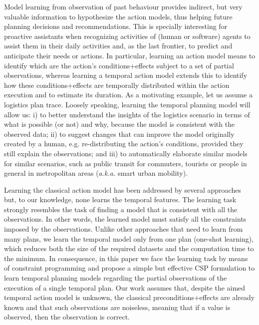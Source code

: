 \documentclass[runningheads]{llncs}
\begin{document}
Model learning from observation of past behaviour provides indirect, but very valuable information to hypothesize the action models, thus helping future planning decisions and recommendations. This is specially interesting for proactive assistants when recognizing activities of (human or software) agents to assist them in their daily activities and, as the last frontier, to predict and anticipate their needs or actions.
In particular, learning an action model means to identify which are the action's conditions+effects subject to a set of partial observations, whereas learning a temporal action model extends this to identify how these conditions+effects are temporally distributed within the action execution and to estimate its duration.
As a motivating example, let us assume a logistics plan trace. Loosely speaking, learning the temporal planning model will allow us: i) to better understand the insights of the logistics scenario in terms of what is possible (or not) and why, because the model is consistent with the observed data; ii) to suggest changes that can improve the model originally created by a human, e.g. re-distributing the action's conditions, provided they still explain the observations; and iii) to automatically elaborate similar models for similar scenarios, such as public transit for commuters, tourists or people in general in metropolitan areas (\emph{a.k.a.} smart urban mobility).


Learning the classical action model has been addressed by several approaches~\cite{aineto2018icaps,bonet2009icaps,cresswell2013,ramirez2012} but, to our knowledge, none learns the temporal features. The learning task strongly resembles the task of finding a model that is consistent with all the observations. In other words, the learned model must satisfy all the constraints imposed by the observations. Unlike other approaches that need to learn from many plans, we learn the temporal model only from one plan (one-shot learning), which reduces both the size of the required datasets and the computation time to the minimum. In consequence, in this paper we face the learning task by means of constraint programming and propose a simple but effective CSP formulation to learn temporal planning models regarding the partial observations of the execution of a single temporal plan. Our work assumes that, despite the aimed temporal action model is unknown, the classical preconditions+effects are already known and that such observations are noiseless, meaning that if a value is observed, then the observation is correct.
\end{document}
